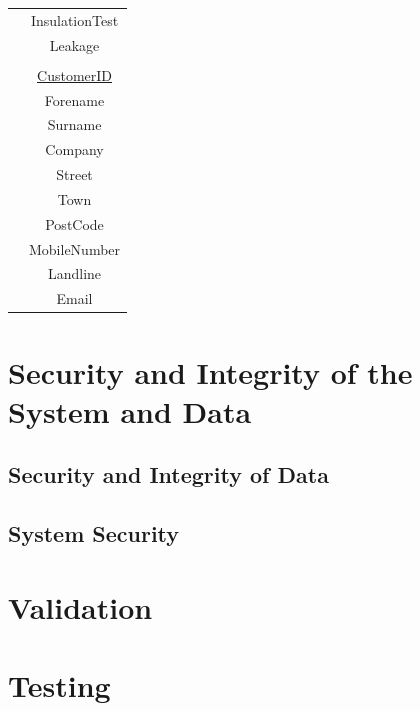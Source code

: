 \begin{center}
\begin{tabular}{|c|c|}
                                   & InsulationTest                \\ 
                                   & Leakage                       \\
                                   &                               \\ 
                                   & \underline{CustomerID}        \\ 
                                   & Forename                      \\
                                   & Surname                       \\ 
                                   & Company                       \\
                                   & Street                        \\
                                   & Town                          \\
                                   & PostCode                      \\ 
                                   & MobileNumber                  \\
                                   & Landline                      \\ 
                                   & Email                         \\ \hline                                                  
    \end{tabular}
\end{center}

\section{Security and Integrity of the System and Data}

\subsection{Security and Integrity of Data}

\subsection{System Security}

\section{Validation}

\section{Testing}

